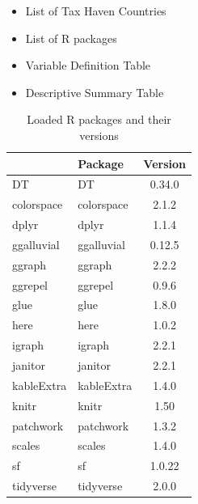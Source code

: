 \documentclass[
  letterpaper,
  DIV=11,
  numbers=noendperiod]{scrreprt}
\begin{document}

\begin{itemize}
\item
  List of Tax Haven Countries
\item
  List of R packages
\item
  Variable Definition Table
\item
  Descriptive Summary Table
\end{itemize}

\begin{longtable}[t]{llc}
\caption{\label{tab:List of R packages and version}Loaded R packages and their versions}\\
\toprule
 & Package & Version\\
\midrule
DT & DT & 0.34.0\\
colorspace & colorspace & 2.1.2\\
dplyr & dplyr & 1.1.4\\
ggalluvial & ggalluvial & 0.12.5\\
ggraph & ggraph & 2.2.2\\
\addlinespace
ggrepel & ggrepel & 0.9.6\\
glue & glue & 1.8.0\\
here & here & 1.0.2\\
igraph & igraph & 2.2.1\\
janitor & janitor & 2.2.1\\
\addlinespace
kableExtra & kableExtra & 1.4.0\\
knitr & knitr & 1.50\\
patchwork & patchwork & 1.3.2\\
scales & scales & 1.4.0\\
sf & sf & 1.0.22\\
\addlinespace
tidyverse & tidyverse & 2.0.0\\
\bottomrule
\end{longtable}
\end{document}
